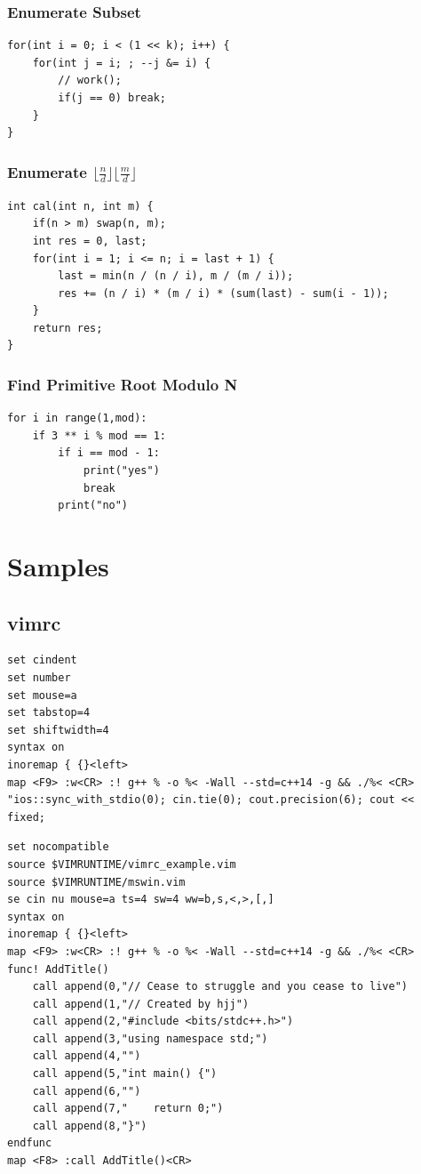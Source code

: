\documentclass[10pt]{ctexart}
\begin{document}
{{\subsubsection{Enumerate Subset}
\begin{lstlisting}
for(int i = 0; i < (1 << k); i++) {
    for(int j = i; ; --j &= i) {
        // work();
        if(j == 0) break;
    }
}
\end{lstlisting}
\subsubsection{Enumerate $\lfloor\frac{n}{d}\rfloor\lfloor\frac{m}{d}\rfloor$}
\begin{lstlisting}
int cal(int n, int m) {
    if(n > m) swap(n, m);
    int res = 0, last;
    for(int i = 1; i <= n; i = last + 1) {
        last = min(n / (n / i), m / (m / i));
        res += (n / i) * (m / i) * (sum(last) - sum(i - 1));
    }
    return res;
}
\end{lstlisting}
\subsubsection{Find Primitive Root Modulo N}
\begin{lstlisting}
for i in range(1,mod):
    if 3 ** i % mod == 1:
        if i == mod - 1:
            print("yes")
            break
        print("no")
\end{lstlisting}






\newpage
\section{Samples}
\subsection{vimrc}
\begin{lstlisting}
set cindent
set number
set mouse=a
set tabstop=4
set shiftwidth=4
syntax on
inoremap { {}<left>
map <F9> :w<CR> :! g++ % -o %< -Wall --std=c++14 -g && ./%< <CR>
"ios::sync_with_stdio(0); cin.tie(0); cout.precision(6); cout << fixed;
\end{lstlisting}
\begin{lstlisting}
set nocompatible
source $VIMRUNTIME/vimrc_example.vim
source $VIMRUNTIME/mswin.vim
se cin nu mouse=a ts=4 sw=4 ww=b,s,<,>,[,]
syntax on
inoremap { {}<left>
map <F9> :w<CR> :! g++ % -o %< -Wall --std=c++14 -g && ./%< <CR>
func! AddTitle()	
    call append(0,"// Cease to struggle and you cease to live")	
    call append(1,"// Created by hjj")
    call append(2,"#include <bits/stdc++.h>")	
    call append(3,"using namespace std;")	
    call append(4,"")	
    call append(5,"int main() {")	
    call append(6,"")	
    call append(7,"    return 0;")	
    call append(8,"}")
endfunc
map <F8> :call AddTitle()<CR>	    
\end{lstlisting}

}}
\end{document}
